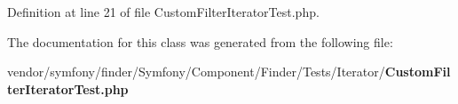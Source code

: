 Definition at line 21 of file Custom\+Filter\+Iterator\+Test.\+php.



The documentation for this class was generated from the following file\+:\begin{DoxyCompactItemize}
\item 
vendor/symfony/finder/\+Symfony/\+Component/\+Finder/\+Tests/\+Iterator/{\bf Custom\+Filter\+Iterator\+Test.\+php}\end{DoxyCompactItemize}
